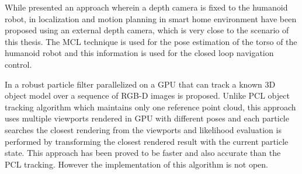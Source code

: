 While \cite{maier2012real} presented an approach wherein a depth camera is fixed to the humanoid robot, in \cite{cervera2012localization} localization and motion planning in smart home environment have been proposed using an external depth camera, which is very close to the scenario of this thesis. The MCL technique is used for the pose estimation of the torso of the humanoid robot and this information is used for the closed loop navigation control.
	
In \cite{choi2013rgb} a robust particle filter parallelized on a GPU that can track a known 3D object model over a sequence of RGB-D images is proposed. Unlike PCL object tracking algorithm \cite{rusu20113d} which maintains only one reference point cloud, this approach uses multiple viewports rendered in GPU with different poses and each particle searches the closest rendering from the viewports and likelihood evaluation is performed by transforming the closest rendered result with the current particle state. This approach has been proved to be faster and also accurate than the PCL tracking. However the implementation of this algorithm is not open.
